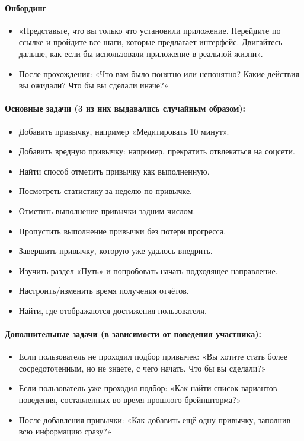 \documentclass[pdflatex,sn-mathphys-num]{sn-jnl}%
\theoremstyle{thmstyleone}%
\theoremstyle{thmstyletwo}%
\theoremstyle{thmstylethree}%
\begin{document}
\paragraph{Онбординг}
\begin{itemize}
\item «Представьте, что вы только что установили приложение. Перейдите по ссылке и пройдите все шаги, которые предлагает интерфейс. Двигайтесь дальше, как если бы использовали приложение в реальной жизни».
\item После прохождения: «Что вам было понятно или непонятно? Какие действия вы ожидали? Что бы вы сделали иначе?»
\end{itemize}

\paragraph{Основные задачи (3 из них выдавались случайным образом):}
\begin{itemize}
\item Добавить привычку, например «Медитировать 10 минут».
\item Добавить вредную привычку: например, прекратить отвлекаться на соцсети.
\item Найти способ отметить привычку как выполненную.
\item Посмотреть статистику за неделю по привычке.
\item Отметить выполнение привычки задним числом.
\item Пропустить выполнение привычки без потери прогресса.
\item Завершить привычку, которую уже удалось внедрить.
\item Изучить раздел «Путь» и попробовать начать подходящее направление.
\item Настроить/изменить время получения отчётов.
\item Найти, где отображаются достижения пользователя.
\end{itemize}

\paragraph{Дополнительные задачи (в зависимости от поведения участника):}
\begin{itemize}
\item Если пользователь не проходил подбор привычек: «Вы хотите стать более сосредоточенным, но не знаете, с чего начать. Что бы вы сделали?»
\item Если пользователь уже проходил подбор: «Как найти список вариантов поведения, составленных во время прошлого брейншторма?»
\item После добавления привычки: «Как добавить ещё одну привычку, заполнив всю информацию сразу?»
\end{itemize}
\end{document}
